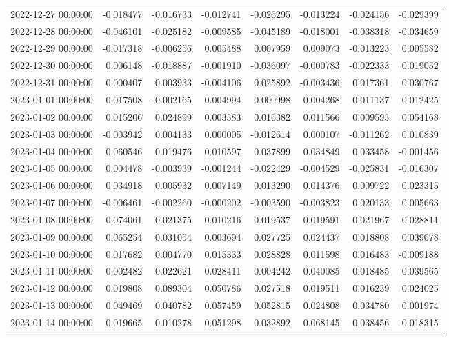 \begin{tabular}{lrrrrrrr}
2022-12-27 00:00:00 & -0.018477 & -0.016733 & -0.012741 & -0.026295 & -0.013224 & -0.024156 & -0.029399 \\
2022-12-28 00:00:00 & -0.046101 & -0.025182 & -0.009585 & -0.045189 & -0.018001 & -0.038318 & -0.034659 \\
2022-12-29 00:00:00 & -0.017318 & -0.006256 & 0.005488 & 0.007959 & 0.009073 & -0.013223 & 0.005582 \\
2022-12-30 00:00:00 & 0.006148 & -0.018887 & -0.001910 & -0.036097 & -0.000783 & -0.022333 & 0.019052 \\
2022-12-31 00:00:00 & 0.000407 & 0.003933 & -0.004106 & 0.025892 & -0.003436 & 0.017361 & 0.030767 \\
2023-01-01 00:00:00 & 0.017508 & -0.002165 & 0.004994 & 0.000998 & 0.004268 & 0.011137 & 0.012425 \\
2023-01-02 00:00:00 & 0.015206 & 0.024899 & 0.003383 & 0.016382 & 0.011566 & 0.009593 & 0.054168 \\
2023-01-03 00:00:00 & -0.003942 & 0.004133 & 0.000005 & -0.012614 & 0.000107 & -0.011262 & 0.010839 \\
2023-01-04 00:00:00 & 0.060546 & 0.019476 & 0.010597 & 0.037899 & 0.034849 & 0.033458 & -0.001456 \\
2023-01-05 00:00:00 & 0.004478 & -0.003939 & -0.001244 & -0.022429 & -0.004529 & -0.025831 & -0.016307 \\
2023-01-06 00:00:00 & 0.034918 & 0.005932 & 0.007149 & 0.013290 & 0.014376 & 0.009722 & 0.023315 \\
2023-01-07 00:00:00 & -0.006461 & -0.002260 & -0.000202 & -0.003590 & -0.003823 & 0.020133 & 0.005663 \\
2023-01-08 00:00:00 & 0.074061 & 0.021375 & 0.010216 & 0.019537 & 0.019591 & 0.021967 & 0.028811 \\
2023-01-09 00:00:00 & 0.065254 & 0.031054 & 0.003694 & 0.027725 & 0.024437 & 0.018808 & 0.039078 \\
2023-01-10 00:00:00 & 0.017682 & 0.004770 & 0.015333 & 0.028828 & 0.011598 & 0.016483 & -0.009188 \\
2023-01-11 00:00:00 & 0.002482 & 0.022621 & 0.028411 & 0.004242 & 0.040085 & 0.018485 & 0.039565 \\
2023-01-12 00:00:00 & 0.019808 & 0.089304 & 0.050786 & 0.027518 & 0.019511 & 0.016239 & 0.024025 \\
2023-01-13 00:00:00 & 0.049469 & 0.040782 & 0.057459 & 0.052815 & 0.024808 & 0.034780 & 0.001974 \\
2023-01-14 00:00:00 & 0.019665 & 0.010278 & 0.051298 & 0.032892 & 0.068145 & 0.038456 & 0.018315 \\

\end{tabular}
